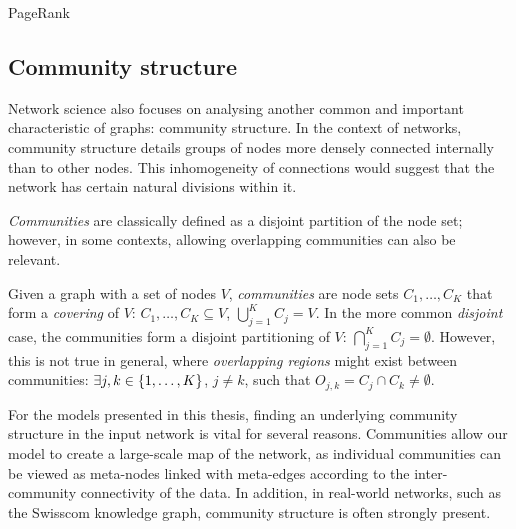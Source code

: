 \begin{algorithm}%
\caption{PageRank}
\label{algorithm:pagerank}
\begin{algorithmic}
\end{algorithmic}
\end{algorithm}

\subsection{Community structure}
Network science also focuses on analysing another common and important characteristic of graphs: community structure. In the context of networks, community structure details groups of nodes more densely connected internally than to other nodes. This inhomogeneity of connections would suggest that the network has certain natural divisions within it.

\emph{Communities} are classically defined as a disjoint partition of the node set; however, in some contexts, allowing overlapping communities can also be relevant.
\begin{definition}
Given a graph with a set of nodes $V$, \emph{communities} are node sets $C_1, \dots, C_K$ that form a \emph{covering} of $V$: $C_1, \dots, C_K \subseteq V$, $\bigcup_{j=1}^{K}{C_j} = V$. In the more common \emph{disjoint} case, the communities form a disjoint partitioning of $V$: $\bigcap_{j=1}^{K}{C_j}=\emptyset$. However, this is not true in general, where \emph{overlapping regions} might exist between communities: $\exists j,k \in \mathopen{}\left\{1,\dots,K\right\}$, $j \neq k$, such that $O_{j,k} = C_j \cap C_k \neq \emptyset$.
\end{definition} 

For the models presented in this thesis, finding an underlying community structure in the input network is vital for several reasons. Communities allow our model to create a large-scale map of the network, as individual communities can be viewed as meta-nodes linked with meta-edges according to the inter-community connectivity of the data. In addition, in real-world networks, such as the Swisscom knowledge graph, community structure is often strongly present.

